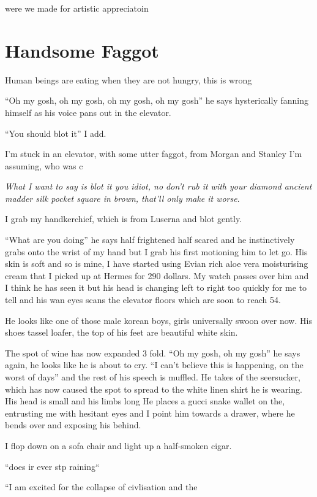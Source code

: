 \documentclass[19pt,openany]{book}
\begin{document}
were we made for artistic appreciatoin

\chapter{Handsome Faggot}

Human beings are eating when they
are not hungry, this is wrong

``Oh my gosh, oh my gosh, oh my gosh,
oh my gosh'' he says hysterically
fanning himself as his voice pans
out in the elevator.

``You should blot it'' I add.

I'm stuck in an elevator,
with some utter faggot,
from Morgan and Stanley
I'm assuming, who was
c

\textit{What I
want to say is blot it you idiot, no don't
rub it with your diamond ancient madder silk pocket square
in brown, that'll only make it worse}.

I grab my handkerchief, which is
from Luserna and blot gently.

``What are you doing'' he says half frightened
half scared and he instinctively grabs onto
the wrist of my hand but I grab
his first motioning him to let go.
His skin is soft and so is mine, I have
started using Evian rich aloe vera moisturising
cream that I picked up at Hermes for 290 dollars.
My watch passes over him and I think he has seen it
but his head is changing left to right
too quickly for me to tell and his wan
eyes scans the elevator floors which are
soon to reach 54.

He looks like one of those male korean boys,
girls universally swoon over now. His shoes
tassel loafer, the top of his feet
are beautiful white skin.

The spot of wine has now expanded 3 fold.
``Oh my gosh, oh my gosh'' he says again,
he looks like he is about to cry. ``I can't believe
this is happening, on the worst of days''
and the
rest of his speech is muffled. He takes of the seersucker,
which has now caused the spot to spread to the white
linen shirt he is wearing.
His head is small and his limbs long
He places a gucci snake wallet on the, entrusting
me with hesitant eyes and I point him towards a
drawer, where he bends over and exposing his behind.

I flop down on a sofa chair and light up a half-smoken
cigar.

``does ir ever stp raining``

``I am excited for the collapse of civlisation
and the
\end{document}
